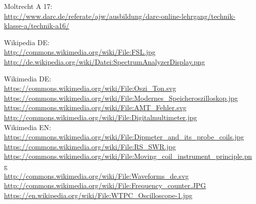 \begin{thebibliography}{}
    Moltrecht A 17: \\
    \url{http://www.darc.de/referate/ajw/ausbildung/darc-online-lehrgang/technik-klasse-a/technik-a16/}

      Wikipedia DE: \\
    \url{http://commons.wikimedia.org/wiki/File:FSL.jpg}\\
    \url{http://de.wikipedia.org/wiki/Datei:SpectrumAnalyzerDisplay.png}

   Wikimedia DE:\\
    \url{https://commons.wikimedia.org/wiki/File:Oszi_Ton.svg}\\
    \url{https://commons.wikimedia.org/wiki/File:Modernes_Speicheroszilloskop.jpg}\\
    \url{https://commons.wikimedia.org/wiki/File:AMT_Fehler.svg}\\
    \url{http://commons.wikimedia.org/wiki/File:Digitalmultimeter.jpg}\\

   Wikimedia EN:\\
    \url{https://commons.wikimedia.org/wiki/File:Dipmeter_and_its_probe_coils.jpg}\\
    \url{https://commons.wikimedia.org/wiki/File:RS_SWR.jpg}\\
    \url{https://commons.wikimedia.org/wiki/File:Moving_coil_instrument_principle.png}\\
    \url{http://commons.wikimedia.org/wiki/File:Waveforms_de.svg}
    \url{http://commons.wikimedia.org/wiki/File:Frequency_counter.JPG}\\
    \url{https://en.wikipedia.org/wiki/File:WTPC_Oscilloscope-1.jpg}\\

\end{thebibliography}


